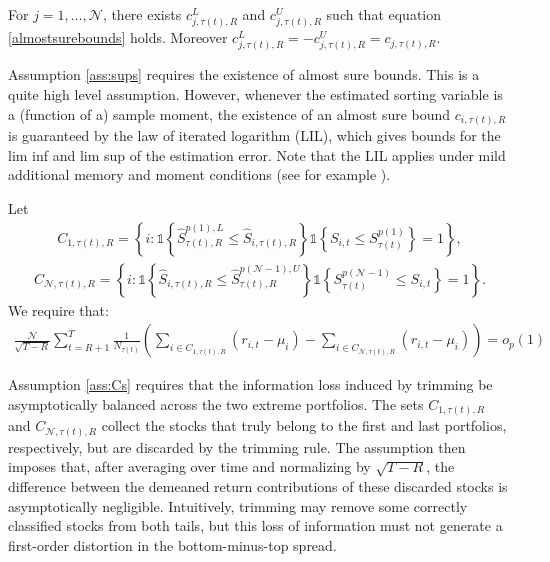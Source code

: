 \begin{assumption}
\label{ass:sups} 
For $j=1,\dots, \mathcal{N}$, there exists $c^L_{j,\tau(t),R}$ and $c^U_{j,\tau(t),R}$ such that equation \eqref{almostsurebounds} holds. Moreover $c^L_{j,\tau(t),R} = - c^U_{j,\tau(t),R} = c_{j,\tau(t),R}$.
\end{assumption}

\noindent
Assumption \ref{ass:sups} requires the existence of almost sure bounds. This is a quite high level assumption. However, whenever the estimated sorting variable is a (function of a) sample moment, the existence of an almost sure bound $c_{i,\tau(t),R}$ is guaranteed by the law of iterated logarithm (LIL), which gives bounds for the lim inf and lim sup of the estimation error. Note that the LIL applies under mild additional memory and moment conditions (see for example \cite{eberlein1986strong}).

\begin{assumption}
\label{ass:Cs} 
Let 
\begin{align*}
    C_{1,\tau (t),R}=\left\{ i: \mathds{1} \left\{ \widehat{S}_{\tau (t),R}^{p(1),L}\leq \widehat{S}_{i,\tau (t),R}\right\} \mathds{1} \left\{ S_{i,t}\leq S_{\tau (t)}^{p(1)}\right\} = 1 \right\},
\end{align*}
\begin{align*}
    C_{\mathcal{N},\tau (t),R}=\left\{ i: \mathds{1} \left\{ \widehat{S}_{i,\tau (t),R}\leq \widehat{S}_{\tau (t),R}^{p(\mathcal{N}-1),U}\right\} \mathds{1} \left\{ S_{\tau (t)}^{p(\mathcal{N}-1)} \leq S_{i,t} \right\} = 1 \right\}.
\end{align*}
We require that:
\begin{align*}
    \frac{\mathcal{N}}{\sqrt{T-R}}\sum_{t=R+1}^{T}\frac{1}{N_{\tau (t)}}\left( \sum_{i\in C_{1,\tau (t),R}} \left( r_{i,t} - \mu_i \right) -\sum_{i\in C_{\mathcal{N},\tau (t),R}} \left( r_{i,t} - \mu_i \right) \right) = o_{p}(1) 
\end{align*}
\end{assumption}

\noindent
Assumption \ref{ass:Cs} requires that the information loss induced by trimming be asymptotically balanced across the two extreme portfolios. The sets $C_{1,\tau(t),R}$ and $C_{\mathcal{N},\tau(t),R}$ collect the stocks that truly belong to the first and last portfolios, respectively, but are discarded by the trimming rule. The assumption then imposes that, after averaging over time and normalizing by $\sqrt{T-R}$, the difference between the demeaned return contributions of these discarded stocks is asymptotically negligible. Intuitively, trimming may remove some correctly classified stocks from both tails, but this loss of information must not generate a first-order distortion in the bottom-minus-top spread.%

